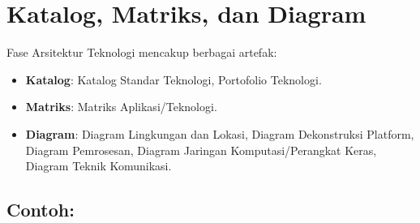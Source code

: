 \section{Katalog, Matriks, dan Diagram}
Fase Arsitektur Teknologi mencakup berbagai artefak:
\begin{itemize}
	\item \textbf{Katalog}: Katalog Standar Teknologi, Portofolio Teknologi.
	\item \textbf{Matriks}: Matriks Aplikasi/Teknologi.
	\item \textbf{Diagram}: Diagram Lingkungan dan Lokasi, Diagram Dekonstruksi Platform, Diagram Pemrosesan, Diagram Jaringan Komputasi/Perangkat Keras, Diagram Teknik Komunikasi.
\end{itemize}

\subsection*{Contoh:}

